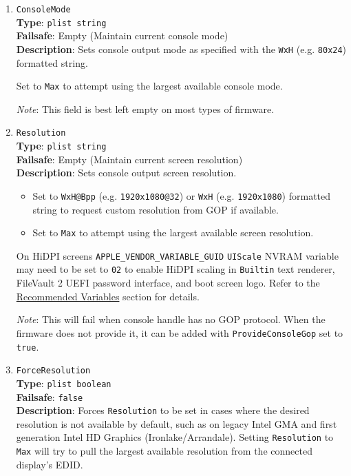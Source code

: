 \documentclass[]{article}
\providecommand{\tightlist}{%
  \setlength{\itemsep}{0pt}\setlength{\parskip}{0pt}}
\begin{document}
\begin{enumerate}
\item
  \texttt{ConsoleMode}\\
  \textbf{Type}: \texttt{plist\ string}\\
  \textbf{Failsafe}: Empty (Maintain current console mode)\\
  \textbf{Description}: Sets console output mode as specified
  with the \texttt{WxH} (e.g. \texttt{80x24}) formatted string.

  Set to \texttt{Max} to attempt using the largest available console mode.

  \emph{Note}: This field is best left empty on most types of firmware.

\item
  \texttt{Resolution}\\
  \textbf{Type}: \texttt{plist\ string}\\
  \textbf{Failsafe}: Empty (Maintain current screen resolution)\\
  \textbf{Description}: Sets console output screen resolution.

  \begin{itemize}
  \tightlist
  \item Set to \texttt{WxH@Bpp} (e.g. \texttt{1920x1080@32}) or \texttt{WxH}
  (e.g. \texttt{1920x1080}) formatted string to request custom resolution
  from GOP if available.
  \item Set to \texttt{Max} to attempt using the largest
  available screen resolution.
  \end{itemize}

  On HiDPI screens \texttt{APPLE\_VENDOR\_VARIABLE\_GUID} \texttt{UIScale}
  NVRAM variable may need to be set to \texttt{02} to enable HiDPI scaling
  in \texttt{Builtin} text renderer, FileVault 2 UEFI password interface,
  and boot screen logo. Refer to the \hyperref[nvramvarsrec]{Recommended Variables}
  section for details.

  \emph{Note}: This will fail when console handle has no GOP protocol. When
  the firmware does not provide it, it can be added with \texttt{ProvideConsoleGop}
  set to \texttt{true}.

\item
  \texttt{ForceResolution}\\
  \textbf{Type}: \texttt{plist\ boolean}\\
  \textbf{Failsafe}: \texttt{false}\\
  \textbf{Description}: Forces \texttt{Resolution} to be set in cases where the desired
  resolution is not available by default, such as on legacy Intel GMA and first
  generation Intel HD Graphics (Ironlake/Arrandale). Setting \texttt{Resolution} to
  \texttt{Max} will try to pull the largest available resolution from the connected
  display's EDID.


\end{enumerate}
\end{document}
